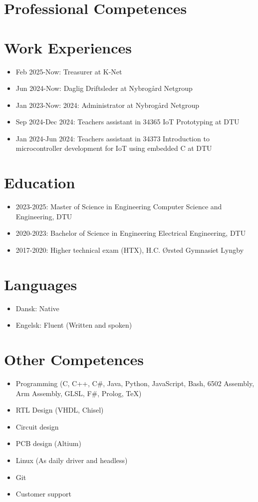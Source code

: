 \section{Professional Competences}


\section{Work Experiences}
	\begin{itemize}
		\item Feb 2025-Now: Treasurer at K-Net
		\item Jun 2024-Now: Daglig Driftsleder at Nybrogård Netgroup
		\item Jan 2023-Now: 2024: Administrator at Nybrogård Netgroup
		\item Sep 2024-Dec 2024: Teachers assistant in 34365 IoT Prototyping at DTU
		\item Jan 2024-Jun 2024: Teachers assistant in 34373 Introduction to microcontroller development for IoT using embedded C at DTU
	\end{itemize}

\section{Education}
	\begin{itemize}
		\item 2023-2025: Master of Science in Engineering Computer Science and Engineering, DTU
		\item 2020-2023: Bachelor of Science in Engineering Electrical Engineering, DTU
		\item 2017-2020: Higher technical exam (HTX), H.C. Ørsted Gymnasiet Lyngby
	\end{itemize}

\section{Languages}
	\begin{itemize}
		\item Dansk: Native
		\item Engelsk: Fluent (Written and spoken)
	\end{itemize}

\section{Other Competences}
	\begin{itemize}
		\item Programming (C, C++, C\#, Java, Python, JavaScript, Bash, 6502 Assembly, Arm Assembly, GLSL, F\#, Prolog, TeX)
		\item RTL Design (VHDL, Chisel)
		\item Circuit design
		\item PCB design (Altium)
		\item Linux (As daily driver and headless)
		\item Git
		\item Customer support
	\end{itemize}
	
